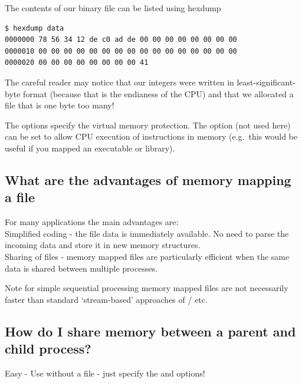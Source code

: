 The contents of our binary file can be listed using hexdump

\begin{lstlisting}
$ hexdump data
0000000 78 56 34 12 de c0 ad de 00 00 00 00 00 00 00 00
0000010 00 00 00 00 00 00 00 00 00 00 00 00 00 00 00 00
0000020 00 00 00 00 00 00 00 00 41   
\end{lstlisting}

The careful reader may notice that our integers were written in least-significant-byte format (because that is the endianess of the CPU) and that we allocated a file that is one byte too many!

The  options specify the virtual memory protection. The option  (not used here) can be set to allow CPU execution of instructions in memory (e.g.~this would be useful if you mapped an executable or library).

\subsection{What are the advantages of memory mapping a file}\label{what-are-the-advantages-of-memory-mapping-a-file}

For many applications the main advantages are:\\
Simplified coding - the file data is immediately available. No need to parse the incoming data and store it in new memory structures.\\
Sharing of files - memory mapped files are particularly efficient when the same data is shared between multiple processes.

Note for simple sequential processing memory mapped files are not necessarily faster than standard `stream-based' approaches of  /  etc.

\subsection{How do I share memory between a parent and child process?}\label{how-do-i-share-memory-between-a-parent-and-child-process}

Easy - Use  without a file - just specify the  and  options!

